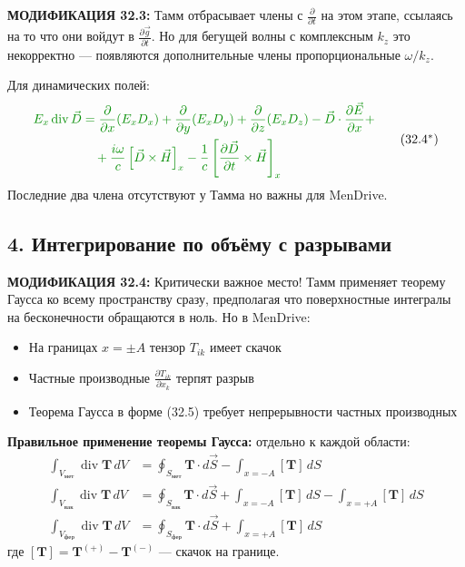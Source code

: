 \documentclass[a4paper,12pt]{article}
\newcommand{\modtext}[1]{\textcolor{modcolor}{#1}}
\newcommand{\modmath}[1]{\textcolor{modcolor}{#1}}
\newcommand{\modblock}[1]{\colorbox{modcolor!10}{\parbox{\dimexpr\linewidth-2\fboxsep}{#1}}}
\begin{document}
\modtext{
\textbf{МОДИФИКАЦИЯ 32.3:} Тамм отбрасывает члены с $\frac{\partial}{\partial t}$
на этом этапе, ссылаясь на то что они войдут в $\frac{\partial\vec{g}}{\partial t}$.
Но для бегущей волны с комплексным $k_z$ это некорректно — появляются
дополнительные члены пропорциональные $\omega/k_z$.
}

\modblock{
\modtext{
Для динамических полей:
\begin{equation}
\modmath{
\begin{aligned}
E_x\operatorname{div}\vec{D} &=
\frac{\partial}{\partial x}(E_x D_x) +
\frac{\partial}{\partial y}(E_x D_y) +
\frac{\partial}{\partial z}(E_x D_z) -
\vec{D}\cdot\frac{\partial\vec{E}}{\partial x} + \\
&\quad + \frac{i\omega}{c}\left[\vec{D}\times\vec{H}\right]_x -
\frac{1}{c}\left[\frac{\partial\vec{D}}{\partial t}\times\vec{H}\right]_x
\end{aligned}
}
\tag{32.4$^*$}
\end{equation}
Последние два члена отсутствуют у Тамма но важны для MenDrive.
}
}

\subsection*{4. Интегрирование по объёму с разрывами}

\modtext{
\textbf{МОДИФИКАЦИЯ 32.4:} Критически важное место! Тамм применяет теорему
Гаусса ко всему пространству сразу, предполагая что поверхностные интегралы
на бесконечности обращаются в ноль. Но в MenDrive:
\begin{itemize}
    \item На границах $x = \pm A$ тензор $T_{ik}$ имеет скачок
    \item Частные производные $\frac{\partial T_{ik}}{\partial x_k}$ терпят разрыв
    \item Теорема Гаусса в форме (32.5) требует непрерывности частных производных
\end{itemize}
}

\textbf{Правильное применение теоремы Гаусса:} отдельно к каждой области:
\begin{align}
\int_{V_{\text{мет}}} \operatorname{div}\mathbf{T}\,dV &=
\oint_{S_{\text{мет}}} \mathbf{T}\cdot d\vec{S} -
\int_{x=-A} [\mathbf{T}]\,dS \\
\int_{V_{\text{вак}}} \operatorname{div}\mathbf{T}\,dV &=
\oint_{S_{\text{вак}}} \mathbf{T}\cdot d\vec{S} +
\int_{x=-A} [\mathbf{T}]\,dS -
\int_{x=+A} [\mathbf{T}]\,dS \\
\int_{V_{\text{фер}}} \operatorname{div}\mathbf{T}\,dV &=
\oint_{S_{\text{фер}}} \mathbf{T}\cdot d\vec{S} +
\int_{x=+A} [\mathbf{T}]\,dS
\tag{32.5$^*$}
\end{align}
где $[\mathbf{T}] = \mathbf{T}^{(+)} - \mathbf{T}^{(-)}$ — скачок на границе.
\end{document}
